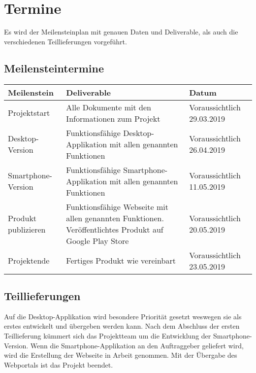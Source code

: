 \section{Termine}
Es wird der Meilensteinplan mit genauen Daten und Deliverable, als auch die verschiedenen Teillieferungen vorgeführt.
\subsection{Meilensteintermine}
\begin{table}[H]
	\begin{center}
		\begin{tabularx}{\linewidth}{|X|X|X|}
			\hline
			\textbf{Meilenstein}&Deliverable&Datum\\
			\hline
			Projektstart&Alle Dokumente mit den Informationen zum Projekt&Voraussichtlich 29.03.2019\\
			\hline
			Desktop-Version&Funktionsfähige Desktop-Applikation mit allen genannten Funktionen&Voraussichtlich 26.04.2019\\
			\hline
			Smartphone-Version&Funktionsfähige Smartphone-Applikation mit allen genannten Funktionen&Voraussichtlich 11.05.2019\\
			\hline
			Produkt publizieren&Funktionsfähige Webseite mit allen genannten Funktionen. Veröffentlichtes Produkt auf Google Play Store&Voraussichtlich 20.05.2019\\
			\hline
			Projektende&Fertiges Produkt wie vereinbart&Voraussichtlich 23.05.2019\\
			\hline
		\end{tabularx}
	\end{center}
\end{table}
\subsection{Teillieferungen}
Auf die Desktop-Applikation wird besondere Priorität gesetzt weswegen sie als erstes entwickelt und übergeben werden kann. Nach dem Abschluss der ersten Teillieferung kümmert sich das Projektteam um die Entwicklung der Smartphone-Version. Wenn die Smartphone-Applikation an den Auftraggeber geliefert wird, wird die Erstellung der Webseite in Arbeit genommen. Mit der Übergabe des Webportals ist das Projekt beendet.